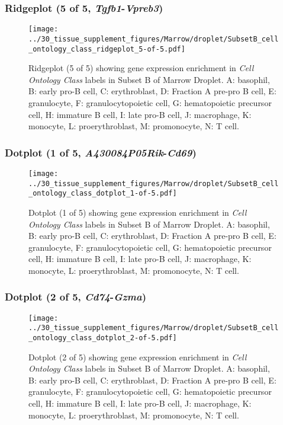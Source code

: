 \clearpage

\subsubsection{Ridgeplot (5 of 5, \emph{Tgfb1}-\emph{Vpreb3})}
\begin{figure}[h]
\centering
\texttt{[image: ../30\_tissue\_supplement\_figures/Marrow/droplet/SubsetB\_cell\_ontology\_class\_ridgeplot\_5-of-5.pdf]}

\caption{ Ridgeplot (5 of 5)  showing gene expression enrichment in \emph{Cell Ontology Class} labels in Subset B of Marrow Droplet. A: basophil, B: early pro-B cell, C: erythroblast, D: Fraction A pre-pro B cell, E: granulocyte, F: granulocytopoietic cell, G: hematopoietic precursor cell, H: immature B cell, I: late pro-B cell, J: macrophage, K: monocyte, L: proerythroblast, M: promonocyte, N: T cell.}
\end{figure}


\clearpage

\subsubsection{Dotplot (1 of 5, \emph{A430084P05Rik}-\emph{Cd69})}
\begin{figure}[h]
\centering
\texttt{[image: ../30\_tissue\_supplement\_figures/Marrow/droplet/SubsetB\_cell\_ontology\_class\_dotplot\_1-of-5.pdf]}

\caption{ Dotplot (1 of 5)  showing gene expression enrichment in \emph{Cell Ontology Class} labels in Subset B of Marrow Droplet. A: basophil, B: early pro-B cell, C: erythroblast, D: Fraction A pre-pro B cell, E: granulocyte, F: granulocytopoietic cell, G: hematopoietic precursor cell, H: immature B cell, I: late pro-B cell, J: macrophage, K: monocyte, L: proerythroblast, M: promonocyte, N: T cell.}
\end{figure}


\clearpage

\subsubsection{Dotplot (2 of 5, \emph{Cd74}-\emph{Gzma})}
\begin{figure}[h]
\centering
\texttt{[image: ../30\_tissue\_supplement\_figures/Marrow/droplet/SubsetB\_cell\_ontology\_class\_dotplot\_2-of-5.pdf]}

\caption{ Dotplot (2 of 5)  showing gene expression enrichment in \emph{Cell Ontology Class} labels in Subset B of Marrow Droplet. A: basophil, B: early pro-B cell, C: erythroblast, D: Fraction A pre-pro B cell, E: granulocyte, F: granulocytopoietic cell, G: hematopoietic precursor cell, H: immature B cell, I: late pro-B cell, J: macrophage, K: monocyte, L: proerythroblast, M: promonocyte, N: T cell.}
\end{figure}


